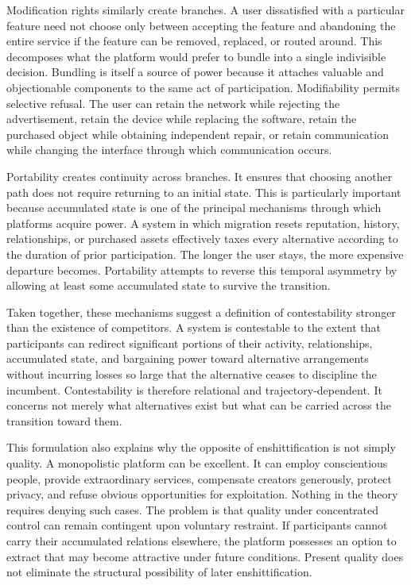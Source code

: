 \documentclass[11pt]{article}
\begin{document}
Modification rights similarly create branches. A user dissatisfied with a particular feature need not choose only between accepting the feature and abandoning the entire service if the feature can be removed, replaced, or routed around. This decomposes what the platform would prefer to bundle into a single indivisible decision. Bundling is itself a source of power because it attaches valuable and objectionable components to the same act of participation. Modifiability permits selective refusal. The user can retain the network while rejecting the advertisement, retain the device while replacing the software, retain the purchased object while obtaining independent repair, or retain communication while changing the interface through which communication occurs.

Portability creates continuity across branches. It ensures that choosing another path does not require returning to an initial state. This is particularly important because accumulated state is one of the principal mechanisms through which platforms acquire power. A system in which migration resets reputation, history, relationships, or purchased assets effectively taxes every alternative according to the duration of prior participation. The longer the user stays, the more expensive departure becomes. Portability attempts to reverse this temporal asymmetry by allowing at least some accumulated state to survive the transition.

Taken together, these mechanisms suggest a definition of contestability stronger than the existence of competitors. A system is contestable to the extent that participants can redirect significant portions of their activity, relationships, accumulated state, and bargaining power toward alternative arrangements without incurring losses so large that the alternative ceases to discipline the incumbent. Contestability is therefore relational and trajectory-dependent. It concerns not merely what alternatives exist but what can be carried across the transition toward them.

This formulation also explains why the opposite of enshittification is not simply quality. A monopolistic platform can be excellent. It can employ conscientious people, provide extraordinary services, compensate creators generously, protect privacy, and refuse obvious opportunities for exploitation. Nothing in the theory requires denying such cases. The problem is that quality under concentrated control can remain contingent upon voluntary restraint. If participants cannot carry their accumulated relations elsewhere, the platform possesses an option to extract that may become attractive under future conditions. Present quality does not eliminate the structural possibility of later enshittification.
\end{document}
